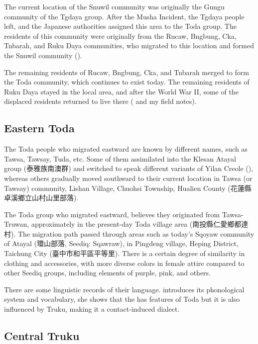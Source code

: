 The current location of the Snuwil community was originally the Gungu community of the Tgdaya group. After the Musha Incident, the Tgdaya people left, and the Japanese authorities assigned this area to the Toda group. The residents of this community were originally from the Rucaw, Bngbung, Cka, Tnbarah, and Ruku Daya communities, who migrated to this location and formed the Snuwil community (\cite{Yap2011, Yap_ongoing_gaoshan}).

The remaining residents of Rucaw, Bngbung, Cka, and Tnbarah merged to form the Toda community, which continues to exist today. The remaining residents of Ruku Daya stayed in the local area, and after the World War II, some of the displaced residents returned to live there (\cite{Yap2011} and my field notes).

\subsection{Eastern Toda} \label{sec:etointro}

The Toda people who migrated eastward are known by different names, such as Tawsa, Tawsay, Tuda, etc. Some of them assimilated into the Klesan Atayal group (泰雅族南澳群) and switched to speak different variants of Yilan Creole (\cite{liao1977Sedtheruy,chienandsanada2010Ch}), whereas others gradually moved southward to their current location in Tawsa (or Tawsay) community, Lishan Village, Chuohsi Township, Hualien County (花蓮縣卓溪鄉立山村山里部落). 

The Toda group who migrated eastward, believes they originated from Tawsa-Truwan, approximately in the present-day Toda village area (南投縣仁愛鄉都達村). The migration path passed through areas such as today's Sqoyaw community of Atayal (環山部落, Seediq: Sqawraw), in Pingdeng village, Heping District, Taichung City (臺中市和平區平等里). There is a certain degree of similarity in clothing and accessories, with more diverse colors in female attire compared to other Seediq groups, including elements of purple, pink, and others.

There are some linguistic records of their language. \textcite{lee2012tawsa} introduces its phonological system and vocabulary, she shows that the has features of Toda but it is also influenced by Truku, making it a contact-induced dialect. 

\subsection{Central Truku}

